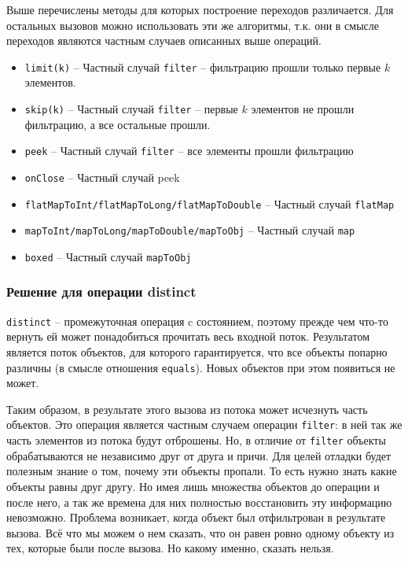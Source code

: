 Выше перечислены методы для которых построение переходов различается. Для остальных вызовов можно использовать эти же алгоритмы, т.к. они в смысле переходов являются частным случаев описанных выше операций.
\begin{itemize}
	\item \texttt{limit(k)} -- Частный случай \texttt{filter} -- фильтрацию прошли только первые $k$ элементов.
	\item \texttt{skip(k)} -- Частный случай \texttt{filter} -- первые $k$ элементов не прошли фильтрацию, а все остальные прошли.
	\item \texttt{peek} -- Частный случай \texttt{filter} -- все элементы прошли фильтрацию
	\item \texttt{onClose} -- Частный случай peek
	\item \texttt{flatMapToInt/flatMapToLong/flatMapToDouble} -- Частный случай \texttt{flatMap}
	\item \texttt{mapToInt/mapToLong/mapToDouble/mapToObj} -- Частный случай \texttt{map}
	\item \texttt{boxed} -- Частный случай \texttt{mapToObj}
\end{itemize}  


\subsubsection{Решение для операции distinct}
\texttt{distinct} -- промежуточная операция c состоянием, поэтому прежде чем что-то вернуть ей может понадобиться прочитать весь входной поток. Результатом является поток объектов, для которого гарантируется, что все объекты попарно различны (в смысле отношения \texttt{equals}\cite{java:equals}). Новых объектов при этом появиться не может.

Таким образом, в результате этого вызова из потока может исчезнуть часть объектов. Это операция является частным случаем операции \texttt{filter}: в ней так же часть элементов из потока будут отброшены. Но, в отличие от \texttt{filter} объекты обрабатываются не независимо друг от друга и причи. Для целей отладки будет полезным знание о том, почему эти объекты пропали. То есть нужно знать какие объекты равны друг другу. Но имея лишь множества объектов до операции и после него, а так же времена для них полностью восстановить эту информацию невозможно. Проблема возникает, когда объект был отфильтрован в результате вызова. Всё что мы можем о нем сказать, что он равен ровно одному объекту из тех, которые были после вызова. Но какому именно, сказать нельзя.

